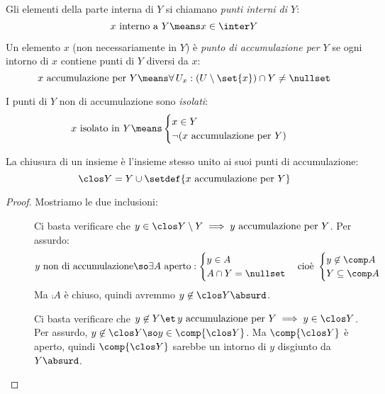 \begin{defn}
	Gli elementi della parte interna di $Y$ si chiamano \emph{punti interni di $Y$}:
	\[x\text{ interno a }Y\means x\in\inter Y\]
\end{defn}

\begin{defn}
	Un elemento $x$ (non necessariamente in $Y$) è \emph{punto di accumulazione per $Y$} se ogni intorno di $x$ contiene punti di $Y$ diversi da $x$:
	\[x\text{ accumulazione per }Y\means\forall\,U_x:(U\setminus\set{x})\cap Y\neq\nullset\]
\end{defn}

\begin{defn}
	I punti di $Y$ non di accumulazione sono \emph{isolati}:
	\[x\text{ isolato in }Y\means
	\begin{cases}
		x\in Y\\
		\neg(x\text{ accumulazione per }Y)
	\end{cases}\]
\end{defn}

\begin{lemma}
	La chiusura di un insieme è l'insieme stesso unito ai suoi punti di accumulazione:
	\[\clos Y=Y\cup\setdef{x\text{ accumulazione per }Y}\]
\end{lemma}

\begin{proof}
	Mostriamo le due inclusioni:
	\begin{description}
		\item[\proofsubseteq]
		Ci basta verificare che $y\in\clos Y\setminus Y\implies y\text{ accumulazione per }Y$.
		Per assurdo:
		\[y\text{ non di accumulazione}\so
		\exists A\text{ aperto}:
		\begin{cases}
			y\in A\\
			A\cap Y=\nullset
		\end{cases}\text{cioè }
		\begin{cases}
			y\not\in\comp A\\
			Y\subseteq\comp A
		\end{cases}\]
		Ma $\comp A$ è chiuso, quindi avremmo $y\not\in\clos Y\absurd$.
		\item[\proofsupseteq]
		Ci basta verificare che $y\not\in Y\et\, y\text{ accumulazione per }Y\implies y\in\clos Y$.
		Per assurdo, $y\not\in\clos Y\so y\in\comp{\clos Y}$. Ma $\comp{\clos Y}$ è aperto, quindi $\comp{\clos Y}$ sarebbe un intorno di $y$ disgiunto da $Y\absurd$. \qedhere
	\end{description}
\end{proof}

